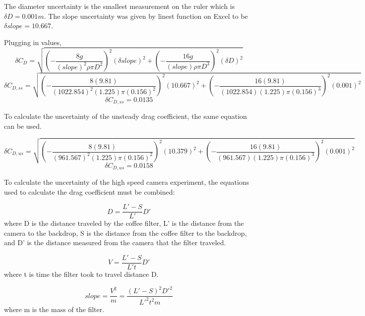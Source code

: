 \documentclass[12pt]{report}
\begin{document}
\noindent The diameter uncertainty is the smallest measurement on the ruler which is $\delta D = 0.001 m$. The slope uncertainty was given by linest function on Excel to be $\delta slope = 10.667$.

\noindent Plugging in values, 
\begin{equation}
	\delta C_D = \sqrt{(-\frac{8g}{(slope)^2\rho \pi D^2})^2(\delta slope)^2+(-\frac{16g}{(slope)\rho \pi D^3})^2(\delta D)^2}
\end{equation}
\begin{equation*}
	\delta C_{D,ss} = \sqrt{(-\frac{8(9.81)}{(1022.854)^2(1.225) \pi (0.156)^2})^2(10.667)^2+(-\frac{16(9.81)}{(1022.854)(1.225) \pi (0.156)^3})^2(0.001)^2}
\end{equation*}
\begin{equation*}
	\delta C_{D,ss} = 0.0135
\end{equation*}

\noindent To calculate the uncertainty of the unsteady drag coefficient, the same equation can be used.

\begin{equation*}
	\delta C_{D,us} = \sqrt{(-\frac{8(9.81)}{(961.567)^2(1.225) \pi (0.156)^2})^2(10.379)^2+(-\frac{16(9.81)}{(961.567)(1.225) \pi (0.156)^3})^2(0.001)^2}
\end{equation*}
\begin{equation*}
	\delta C_{D,us} = 0.0158
\end{equation*}

\noindent To calculate the uncertainty of the high speed camera experiment, the equations used to calculate the drag coefficient must be combined:

\begin{equation}
	D =\frac{L'-S}{L'}D'
\end{equation}
where D is the distance traveled by the coffee filter, L' is the distance from the camera to the backdrop, S is the distance from the coffee filter to the backdrop, and D' is the distance measured from the camera that the filter traveled.

\begin{equation}
	V =\frac{L'-S}{L't}D'
\end{equation}
where t is time the filter took to travel distance D.

\begin{equation}
	slope = \frac{V^2}{m} = \frac{(L'-S)^2D'^2}{L'^2t^2m}
\end{equation}
where m is the mass of the filter.\\
\end{document}
